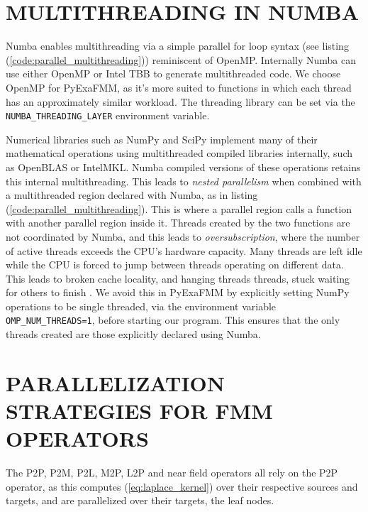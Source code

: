 \documentclass{IEEEcsmag}
\begin{document}
\section{MULTITHREADING IN NUMBA}

Numba enables multithreading via a simple parallel for loop syntax (see listing (\ref{code:parallel_multithreading})) reminiscent of OpenMP. Internally Numba can use either OpenMP or Intel TBB to generate multithreaded code. We choose OpenMP for PyExaFMM, as it's more suited to functions in which each thread has an approximately similar workload. The threading library can be set via the \lstinline{NUMBA_THREADING_LAYER} environment variable.

Numerical libraries such as NumPy and SciPy implement many of their mathematical operations using multithreaded compiled libraries internally, such as OpenBLAS or IntelMKL. Numba compiled versions of these operations retains this internal multithreading. This leads to \textit{nested parallelism} when combined with a multithreaded region declared with Numba, as in listing (\ref{code:parallel_multithreading}). This is where a parallel region calls a function with another parallel region inside it. Threads created by the two functions are not coordinated by Numba, and this leads to \textit{oversubscription}, where the number of active threads exceeds the CPU's hardware capacity. Many threads are left idle while the CPU is forced to jump between threads operating on different data. This leads to broken cache locality, and hanging threads threads, stuck waiting for others to finish \cite{Malakhov2016}. We avoid this in PyExaFMM by explicitly setting NumPy operations to be single threaded, via the environment variable \lstinline{OMP_NUM_THREADS=1}, before starting our program. This ensures that the only threads created are those explicitly declared using Numba.



\section{PARALLELIZATION STRATEGIES FOR FMM OPERATORS}

The P2P, P2M, P2L, M2P, L2P and near field operators all rely on the P2P operator, as this computes (\ref{eq:laplace_kernel}) over their respective sources and targets, and are parallelized over their targets, the leaf nodes.
\end{document}
